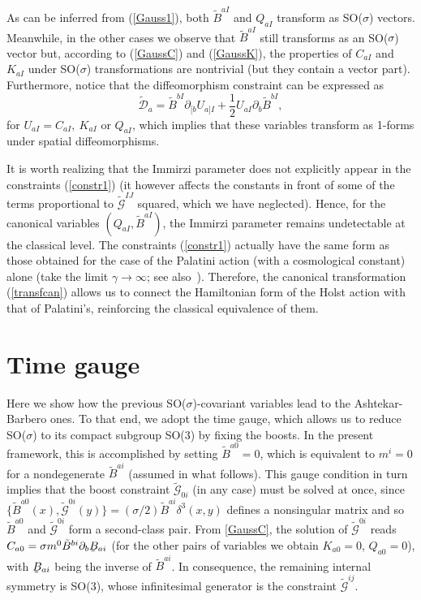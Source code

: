\documentclass[aps,prd,reprint,showpacs,longbibliography,superscriptaddress, groupedaddres,
titlepage,nofootinbib]{revtex4-1} %
\begin{document}
As can be inferred from (\ref{Gauss1}), both $\tilde{B}^{aI}$ and $Q_{aI}$ transform as SO($\sigma$) vectors. Meanwhile, in the other cases we observe that $\tilde{B}^{aI}$ still transforms as an SO($\sigma$) vector but, according to (\ref{GaussC}) and (\ref{GaussK}), the properties of $C_{aI}$ and $K_{aI}$ under SO($\sigma$) transformations are nontrivial (but they contain a vector part). Furthermore, notice that the diffeomorphism constraint can be expressed as
\begin{equation}\label{diff}
	\tilde{\mathcal{D}}_a=\tilde{B}^{bI}\partial_{[b}U_{a]I}+\frac{1}{2}U_{aI}\partial_b\tilde{B}^{bI},
\end{equation}
for $U_{aI}=C_{aI},\ K_{aI}$ or $Q_{aI}$, which implies that these variables transform as 1-forms under spatial diffeomorphisms.

It is worth realizing that the Immirzi parameter does not explicitly appear in the constraints (\ref{constr1}) (it however affects the constants in front of some of the terms proportional to $\tilde{\mathcal{G}}^{IJ}$ squared, which we have neglected). Hence, for the canonical variables $(Q_{aI},\tilde{B}^{aI})$, the Immirzi parameter remains undetectable at the classical level. The constraints (\ref{constr1}) actually have the same form as those obtained for the case of the Palatini action (with a cosmological constant) alone (take the limit $\gamma\rightarrow\infty$; see also~\cite{peld1994115}). Therefore, the canonical transformation (\ref{transfcan}) allows us to connect the Hamiltonian form of the Holst action with that of Palatini's, reinforcing the classical equivalence of them.

\section{Time gauge}

Here we show how the previous SO($\sigma$)-covariant variables lead to the Ashtekar-Barbero ones. To that end, we adopt the time gauge, which allows us to reduce SO($\sigma$) to its compact subgroup SO(3) by fixing the boosts. In the present framework, this is accomplished by setting $\tilde{B}^{a0}=0$, which is equivalent to $m^i=0$ for a nondegenerate $\tilde{B}^{ai}$ (assumed in what follows). This gauge condition in turn implies that the boost constraint $\tilde{\mathcal{G}}_{0i}$ (in any case) must be solved at once, since $\{\tilde{B}^{a0}(x),\tilde{\mathcal{G}}^{0i}(y)\}=(\sigma/2)\tilde{B}^{ai}\delta^3(x,y)$ defines a nonsingular matrix and so $\tilde{B}^{a0}$ and $\tilde{\mathcal{G}}^{0i}$ form a second-class pair.  From \eqref{GaussC}, the solution of $\tilde{\mathcal{G}}^{0i}$ reads $C_{a0}=\sigma m^0 \tilde{B}^{bi}\partial_{b}\underaccent{\tilde}{B}_{ai}$ (for the other pairs of variables we obtain $K_{a0}=0$, $Q_{a0}=0$), with $\underaccent{\tilde}{B}_{ai}$ being the inverse of $\tilde{B}^{ai}$. In consequence, the remaining internal symmetry is SO(3), whose infinitesimal generator is the constraint $\tilde{\mathcal{G}}^{ij}$.
\end{document}
